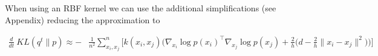 \documentclass{article}
\begin{document}
    When using an RBF kernel we can use the additional simplifications (see Appendix) reducing the approximation to

    \begin{align}
        \frac{d}{dt}\ KL( q^t \| p ) \approx -& \frac{1}{n^2}\sum_{x_i,x_j}^n  \Bigg[
            k(x_i,x_j) \Bigg( \nabla_{x_i} \log p(x_i)^\top \nabla_{x_j} \log p(x_j)  
            + \frac{2}{h}\Big( d - \frac{2}{h} \|x_i - x_j\|^2 \Big) \Bigg)
        \Bigg]
    \end{align} 


\end{document}
